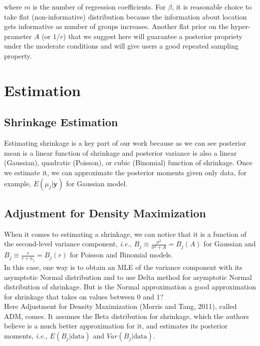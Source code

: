 \documentclass[article]{jss}
\begin{document}
where $m$ is the number of regression coefficients. For $\beta$, it is reasonable choice to take flat (non-informative) distribution because the information about location gets informative as number of groups increases. Another flat prior on the hyper-prameter $A$ (or $1/r$) that we suggest here will guarantee a posterior propriety under the moderate conditions and will give users a good repeated sampling property.
\\



\section[Estimation]{Estimation}
\subsection[Shrinkage Estimation]{Shrinkage Estimation}
Estimating shrinkage is a key part of our work because as we can see posterior mean is a linear function of shrinkage and posterior variance is also a linear (Gaussian), quadratic (Poisson), or cubic (Binomial) function of shrinkage. Once we estimate it, we can approximate the posterior moments given only data, for example, $E(\mu_{j}\vert \textbf{y})$ for Gaussian model.
\subsection[ADM]{Adjustment for Density Maximization}
When it comes to estimating a shrinkage, we can notice that it is a function of the second-level variance component, \emph{i.e.}, $B_{j}\equiv\frac{\sigma^{2}}{\sigma^{2}+A}=B_{j}(A)$ for Gaussian and $B_{j}\equiv\frac{r}{r+n_{j}}=B_{j}(r)$ for Poisson and Binomial models.
\\

In this case, one way is to obtain an MLE of the variance component with its asymptotic Normal distribution and to use Delta method for asymptotic Normal distribution of shrinkage. But is the Normal approximation a good approximation for shrinkage that takes on values between 0 and 1?
\\

Here Adjustment for Density Maximization (Morris and Tang, 2011), called ADM, comes. It assumes the Beta distribution for shrinkage, which the authors believe is a much better approximation for it, and estimates its posterior moments, \emph{i.e.}, $E(B_{j}\vert\textrm{data})$ and $Var(B_{j}\vert\textrm{data})$.
\end{document}
